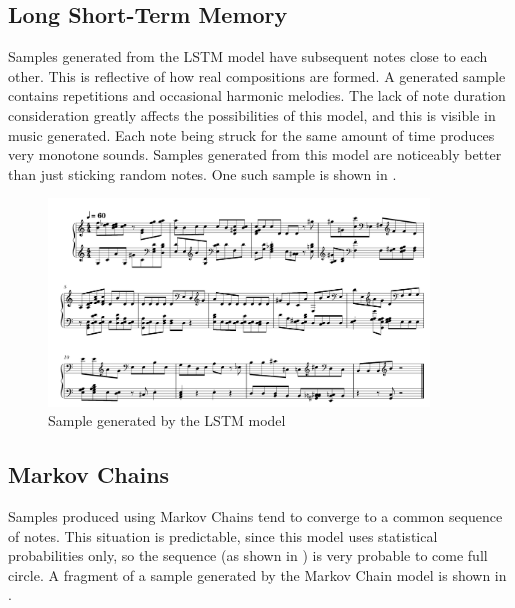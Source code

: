 \documentclass[a4paper, 11pt, twoside]{report}
\theoremstyle{definition}
\begin{document}
\subsection{Long Short-Term Memory}

Samples generated from the LSTM model have subsequent notes close to each other. This is reflective of how real compositions are formed. A generated sample contains repetitions and occasional harmonic melodies. The lack of note duration consideration greatly affects the possibilities of this model, and this is visible in music generated. Each note being struck for the same amount of time produces very monotone sounds. Samples generated from this model are noticeably better than just sticking random notes. One such sample is shown in . \par

\begin{figure}[H]
    \begin{center}
        \includegraphics[width=0.9\textwidth]{lstm_sample.png}
        \caption{Sample generated by the LSTM model}
        \label{fig:lstm-sample}
    \end{center}
\end{figure}

\subsection{Markov Chains}

Samples produced using Markov Chains tend to converge to a common sequence of notes. This situation is predictable, since this model uses statistical probabilities only, so the sequence (as shown in ) is very probable to come full circle. A fragment of a sample generated by the Markov Chain model is shown in . \par
\end{document}
